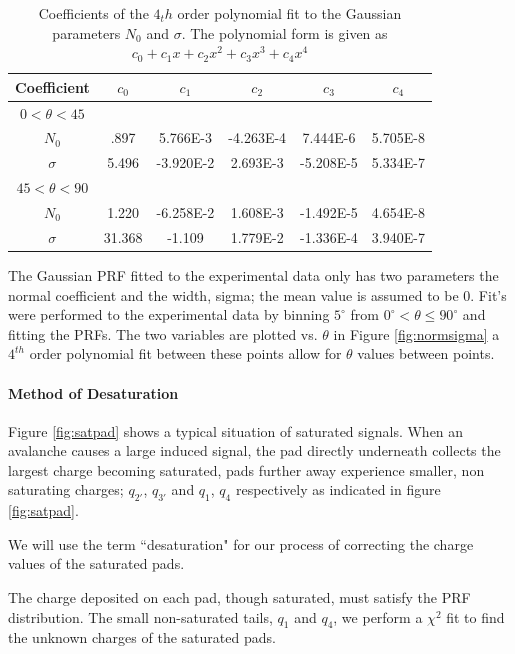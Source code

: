 \documentclass[review]{elsarticle}
\begin{document}
\begin{table}
\centering
 \begin{tabular}{||c c c c c c||} 
 \hline
 Coefficient & $c_0$ & $c_1$ & $c_2$ & $c_3$ & $c_4$ \\ [0.5ex] 
 \hline\hline
 $0 < \theta < 45$ & & & & &  \\ [.25ex]
 \hline
 $N_0$ & .897 & 5.766E-3 & -4.263E-4 & 7.444E-6 & 5.705E-8 \\ 
 \hline
 $\sigma$ & 5.496 & -3.920E-2 & 2.693E-3 & -5.208E-5 & 5.334E-7\\
 \hline
 $45 < \theta < 90$ & & & &  & \\ [.25ex]
 \hline	
 $N_0$ & 1.220 & -6.258E-2 & 1.608E-3 & -1.492E-5  & 4.654E-8 \\
 \hline
 $\sigma$ & 31.368 & -1.109 & 1.779E-2 & -1.336E-4 & 3.940E-7\\
 \hline
\end{tabular}
\caption{Coefficients of the $4_th$ order polynomial fit to the Gaussian parameters $N_0$ and $\sigma$. The polynomial form is given as $c_0 + c_1 x + c_2 x^2 + c_3 x^3 + c_4 x^4$}
\label{tb:coeff}
\end{table}
 
The Gaussian PRF fitted to the experimental data only has two parameters the normal coefficient and the width, sigma; the mean value is assumed to be 0. Fit's were performed to the experimental data by binning $5^{\circ}$ from $0^{\circ} < \theta \leq 90^{\circ}$ and fitting the PRFs. The two variables are plotted vs. $\theta$ in Figure \ref{fig:normsigma} a $4^{th}$ order polynomial fit between these points allow for $\theta$ values between points. 

\paragraph{Method of Desaturation}
Figure \ref{fig:satpad} shows a typical situation of saturated signals. When an avalanche causes a large induced signal, the pad directly underneath collects the largest charge becoming saturated, pads further away experience smaller, non saturating charges; $q_{2'}$, $q_{3'}$ and  $q_{1}$, $q_{4}$ respectively as indicated in figure \ref{fig:satpad}. 

We will use the term ``desaturation" for our process of correcting the charge values of the saturated pads.

The charge deposited on each pad, though saturated, must satisfy the PRF distribution. The small non-saturated tails, $q_{1}$ and $q_{4}$, we perform a $\chi^2$ fit to find the unknown charges of the saturated pads. 
\end{document}
